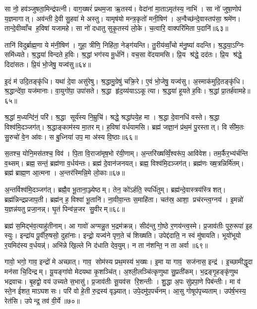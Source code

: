सा नो॒ हव॑ञ्जुषता॒मिन्द्र॑पत्नी। वाग॒ख्षरं॑ प्रथम॒जा ऋ॒तस्य॑। वेदा॑नां मा॒ताऽमृत॑स्य॒ नाभि॑। सा नो॑ जुषा॒णोप॑ य॒ज्ञमागात्। अव॑न्ती दे॒वी सु॒हवा॑ मे अस्तु। यामृष॑यो मन्त्र॒कृतो॑ मनी॒षिण॑। अ॒न्वैच्छ॑न्दे॒वास्तप॑सा॒ श्रमे॑ण। तान्दे॒वीव्वाँच ह॒विषा॑ यजामहे। सा नो॑ दधातु सुकृ॒तस्य॑ लो॒के। च॒त्वारि॒ वाक्परि॑मिता प॒दानि॑॥६३॥

तानि॑ विदुर्ब्राह्म॒णा ये म॑नी॒षिण॑। गुहा॒ त्रीणि॒ निहि॑ता॒ नेङ्ग॑यन्ति। तु॒रीय॑व्वाँ॒चो म॑नु॒ष्या॑ वदन्ति। श्र॒द्धया॒ऽग्निः समि॑ध्यते। श्र॒द्धया॑ विन्दते ह॒विः। श्र॒द्धां भग॑स्य मू॒र्धनि॑। वच॒सा वे॑दयामसि। प्रि॒य श्र॑द्धे॒ दद॑तः। प्रि॒य श्र॑द्धे॒ दिदा॑सतः। प्रि॒यं भो॒जेषु॒ यज्व॑सु॥६४॥

इ॒दं म॑ उदि॒तङ्कृ॑धि। यथा॑ दे॒वा असु॑रेषु। श्र॒द्धामु॒ग्रेषु॑ चक्रि॒रे। ए॒वं भो॒जेषु॒ यज्व॑सु। अ॒स्माक॑मुदि॒तङ्कृ॑धि। श्र॒द्धान्दे॑वा॒ यज॑मानाः। वा॒युगो॑पा॒ उपा॑सते। श्र॒द्धा हृ॑द॒य्य॑याऽऽकूत्या। श्र॒द्धया॑ हूयते ह॒विः। श्र॒द्धां प्रा॒तर्\mbox{}ह॑वामहे॥६५॥

श्र॒द्धां म॒ध्यन्दि॑नं॒ परि॑। श्र॒द्धा सूर्य॑स्य नि॒म्रुचि॑। श्रद्धे॒ श्रद्धा॑पये॒ह मा। श्र॒द्धा दे॒वानधि॑ वस्ते। श्र॒द्धा विश्व॑मि॒दञ्जग॑त्। श्र॒द्धाङ्काम॑स्य मा॒तरम्। ह॒विषा॑ वर्धयामसि। ब्रह्म॑ जज्ञा॒नं प्र॑थ॒मं पु॒रस्तात्। वि सी॑म॒तः सु॒रुचो॑ वे॒न आ॑वः। स बु॒ध्निया॑ उप॒ मा अ॑स्य वि॒ष्ठाः॥६६॥

स॒तश्च॒ योनि॒मस॑तश्च॒ विव॑। पि॒ता वि॒राजा॑मृष॒भो र॑यी॒णाम्। अ॒न्तरि॑ख्षव्विँ॒श्वरू॑प॒ आवि॑वेश। तम॒र्कैर॒भ्य॑र्चन्ति व॒थ्सम्। ब्रह्म॒ सन्तं॒ ब्रह्म॑णा व॒र्धय॑न्तः। ब्रह्म॑ दे॒वान॑जनयत्। ब्रह्म॒ विश्व॑मि॒दञ्जग॑त्। ब्रह्म॑णः ख्ष॒त्रन्निर्मि॑तम्। ब्रह्म॑ ब्राह्म॒ण आ॒त्मना। अ॒न्तर॑स्मिन्नि॒मे लो॒काः॥६७॥

अ॒न्तर्विश्व॑मि॒दञ्जग॑त्। ब्रह्मै॒व भू॒ताना॒ञ्ज्येष्ठम्। तेन॒ को॑ऽर्\mbox{}हति॒ स्पर्धि॑तुम्। ब्रह्म॑न्दे॒वास्त्रय॑स्त्रिशत्। ब्रह्म॑न्निन्द्रप्रजाप॒ती। ब्रह्म॑न् ह॒ विश्वा॑ भू॒तानि॑। ना॒वीवा॒न्तः स॒माहि॑ता। चत॑स्र॒ आशा॒ प्रच॑रन्त्व॒ग्नय॑। इ॒मन्नो॑ य॒ज्ञन्न॑यतु प्रजा॒नन्न्। घृ॒तं पिन्व॑न्न॒जर सु॒वीरम्॥६८॥

ब्रह्म॑ स॒मिद्भ॑व॒त्याहु॑तीनाम्। आ गावो॑ अग्मन्नु॒त भ॒द्रम॑क्रन्न्। सीद॑न्तु गो॒ष्ठे र॒णय॑न्त्व॒स्मे। प्र॒जाव॑तीः पुरु॒रूपा॑ इ॒ह स्युः। इन्द्रा॑य पू॒र्वीरु॒षसो॒ दुहा॑नाः। इन्द्रो॒ यज्व॑ने पृण॒ते च॑ शिख्षति। उपेद्द॑दाति॒ न स्वं मु॑षायति। भूयो॑भूयो र॒यमिद॑स्य व॒र्धयन्न्॑। अभि॑न्ने खि॒ल्ले नि द॑धाति देव॒युम्। न ता न॑शन्ति॒ न ता अर्वा॥६९॥

गावो॒ भगो॒ गाव॒ इन्द्रो॑ मे अच्छात्। गाव॒ सोम॑स्य प्रथ॒मस्य॑ भ॒ख्षः। इ॒मा या गाव॒ सज॑नास॒ इन्द्र॑। इ॒च्छामीद्धृ॒दा मन॑सा चि॒दिन्द्रम्। यू॒यङ्गा॑वो मेदयथा कृ॒शञ्चि॑त्। अ॒श्ली॒लञ्चि॑त्कृणुथा सु॒प्रती॑कम्। भ॒द्रङ्गृ॒हङ्कृ॑णुथ भद्रवाचः। बृ॒हद्वो॒ वय॑ उच्यते स॒भासु॑। प्र॒जाव॑तीः सू॒यव॑स रि॒शन्तीः। शु॒द्धा अ॒पः सु॑प्रपा॒णे पिब॑न्तीः। मा व॑ स्ते॒न ई॑शत॒ माऽघशसः। परि॑ वो हे॒ती रु॒द्रस्य॑ वृञ्ज्यात्। उपे॒दमु॑प॒पर्च॑नम्। आ॒सु गोषूप॑पृच्यताम्। उप॑र्\mbox{}ष॒भस्य॒ रेत॑सि। उपेन्द्र॒ तव॑ वी॒र्ये॥७०॥\anuvakamend[च॒रा॒मि॒ कनी॑यो॒ऽन्यानर्पि॑ता प॒दानि॒ यज्व॑सु हवामहे वि॒ष्ठा लो॒काः सु॒वीर॒मर्वा॒ पिब॑न्ती॒ष्षट्च॑]

